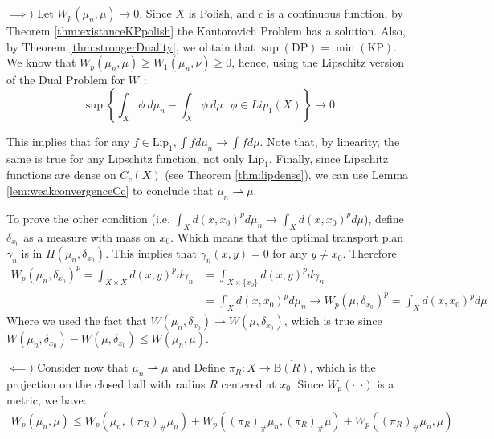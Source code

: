 \begin{prf}

  $\implies)$ Let $W_p(\mu_n,\mu)\to 0$. Since $X$ is Polish, and $c$ is a continuous function,
  by Theorem \ref{thm:existanceKPpolish} the Kantorovich Problem has a solution. Also, by Theorem \ref{thm:strongerDuality},
  we obtain that $\sup(\mathrm{DP})=\min(\mathrm{KP})$. We know that
  $W_p(\mu_n,\mu) \geq W_1(\mu_n,\nu)\geq 0$, hence, using the Lipschitz version of the Dual Problem for $W_1$:
  \begin{equation*}
    \sup \left \{
    \int_X \phi \ d\mu_n - \int_X \phi \ d\mu \ :
    \phi \in Lip_1(X)
    \right \} \to 0
  \end{equation*}

This implies that for any $f \in \text{Lip}_1, \int f d\mu_n \to \int f d\mu$. Note that, by linearity,
the same is true for any Lipschitz function, not only $\text{Lip}_1$. Finally, since Lipschitz functions are
dense on $C_c(X)$ (see Theorem \ref{thm:lipdense}),
we can use Lemma \ref{lem:weakconvergenceCc} to conclude that $\mu_n \rightharpoonup \mu$.

To prove the other condition (i.e.
$\int_X d(x,x_0)^p d\mu_n \to \int_X d(x,x_0)^p d\mu$),
define $\delta_{x_0}$ as a measure with mass on $x_0$. Which means that the optimal transport plan
$\gamma_n$ is in $\Pi(\mu_n,\delta_{x_0})$. This implies that $\gamma_n(x,y) = 0$ for any $y \neq x_0$. Therefore
\begin{align*}
  W_p(\mu_n,\delta_{x_0})^p = \int_{X \times X} d(x,y)^p d\gamma_n & = \int_{X \times \{x_0\}} d(x,y)^p d\gamma_n                              \\
  & = \int_X d(x,x_0)^p d\mu_n \to W_p(\mu,\delta_{x_0})^p = \int_X d(x,x_0)^p d\mu
\end{align*}
Where we used the fact that $W(\mu_n, \delta_{x_0}) \to W(\mu,\delta_{x_0})$, which is true since
$W(\mu_n,\delta_{x_0}) - W(\mu,\delta_{x_0}) \leq W(\mu_n,\mu)$.

\vspace{5mm}
$\impliedby)$ Consider now that $\mu_n \rightharpoonup \mu$ and
Define $\pi_R :X \to \overline{\text{B}(R)}$, which is the projection on the closed ball with radius $R$
centered at $x_0$. Since $W_p(\cdot,\cdot)$ is a metric, we have:
\begin{gather*}
  W_p(\mu_n,\mu) \leq
  W_p(\mu_n,(\pi_R)_\#\mu_n) +
  W_p((\pi_R)_\#\mu_n,(\pi_R)_\#\mu)+
  W_p((\pi_R)_\#\mu_n,\mu)
\end{gather*}


\end{prf}
